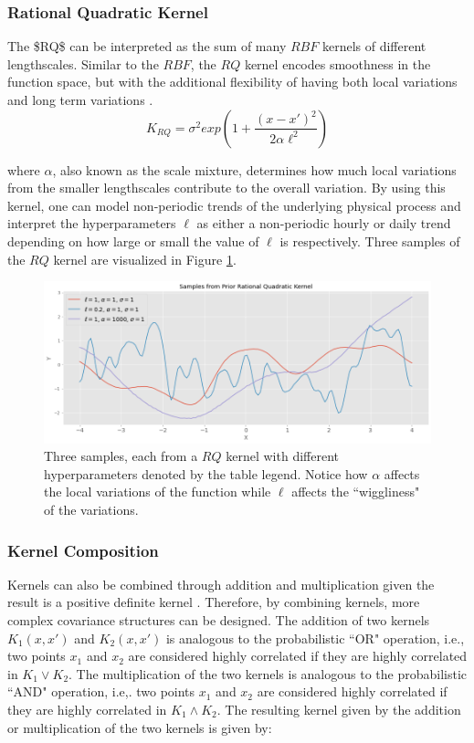 \subsubsection{Rational Quadratic Kernel}

The \ac{$RQ$} can be interpreted as the sum of many $RBF$ kernels of different lengthscales. Similar to the $RBF$, the $RQ$ kernel encodes smoothness in the function space, but with the additional flexibility of having both local variations and long term variations \cite{gp_prices}. 
\begin{equation}
    K_{RQ} = \sigma^2 exp(1 + \frac{(x - x')^2}{2\alpha \ell^2})
\end{equation}

where $\alpha$, also known as the scale mixture, determines how much local variations from the smaller lengthscales contribute to the overall variation. By using this kernel, one can model non-periodic trends of the underlying physical process and interpret the hyperparameters $\ell$ as either a non-periodic hourly or daily trend depending on how large or small the value of $\ell$ is respectively. Three samples of the $RQ$ kernel are visualized in Figure \ref{fig:fig4}.

\begin{figure}[htp]
\centering
\graphicspath{ {./images/} }
\includegraphics[scale=0.49]{images/samples_rq_prior.png}
\caption{Three samples, each from a $RQ$ kernel with different hyperparameters denoted by the table legend. Notice how $\alpha$ affects the local variations of the function while $\ell$ affects the ``wiggliness" of the variations.}
\label{fig:fig4}
\end{figure}

\subsubsection{Kernel Composition}

Kernels can also be combined through addition and multiplication given the result is a positive definite kernel \cite{pml1Book}. Therefore, by combining kernels, more complex covariance structures can be designed. The addition of two kernels $K_1(x, x')$ and $K_2(x, x')$ is analogous to the probabilistic ``OR" operation, i.e., two points $x_1$ and $x_2$ are considered highly correlated if they are highly correlated in $K_1 \lor K_2$. The multiplication of the two kernels is analogous to the probabilistic ``AND" operation, i.e,. two points $x_1$ and $x_2$ are considered highly correlated if they are highly correlated in $K_1 \land K_2$. The resulting kernel given by the addition or multiplication of the two kernels is given by:

